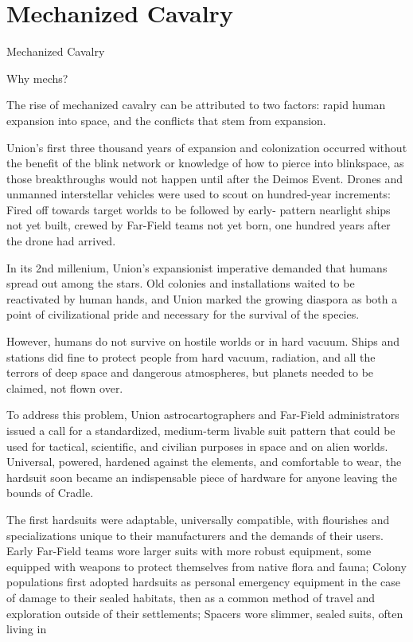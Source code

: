 \section{Mechanized Cavalry}
Mechanized Cavalry  

Why mechs? 
 

The rise of mechanized cavalry can be attributed to two factors: rapid human expansion into  
space, and the conflicts that stem from expansion. 
 

Union’s first three thousand years of expansion and colonization occurred without the benefit of  
the blink network or knowledge of how to pierce into blinkspace, as those breakthroughs would  
not happen until after the Deimos Event. Drones and unmanned interstellar vehicles were used to  
scout on hundred-year increments: Fired off towards target worlds to be followed by early- 
pattern nearlight ships not yet built, crewed by Far-Field teams not yet born, one hundred years  
after the drone had arrived.
 

In its 2nd millenium, Union’s expansionist imperative demanded that humans spread out among  
the stars. Old colonies and installations waited to be reactivated by human hands, and Union  
marked the growing diaspora as both a point of civilizational pride and necessary for the survival  
of the species. 
 

However, humans do not survive on hostile worlds or in hard vacuum. Ships and stations did fine  
to protect people from hard vacuum, radiation, and all the terrors of deep space and dangerous  
atmospheres, but planets needed to be claimed, not flown over.
 

To address this problem, Union astrocartographers and Far-Field administrators issued a call for  
a standardized, medium-term livable suit pattern that could be used for tactical, scientific, and  
civilian purposes in space and on alien worlds. Universal, powered, hardened against the  
elements, and comfortable to wear, the hardsuit soon became an indispensable piece of  
hardware for anyone leaving the bounds of Cradle. 
 

The first hardsuits were adaptable, universally compatible, with flourishes and specializations  
unique to their manufacturers and the demands of their users. Early Far-Field teams wore larger  
suits with more robust equipment, some equipped with weapons to protect themselves from  
native flora and fauna; Colony populations first adopted hardsuits as personal emergency  
equipment in the case of damage to their sealed habitats, then as a common method of travel  
and exploration outside of their settlements; Spacers wore slimmer, sealed suits, often living in  

